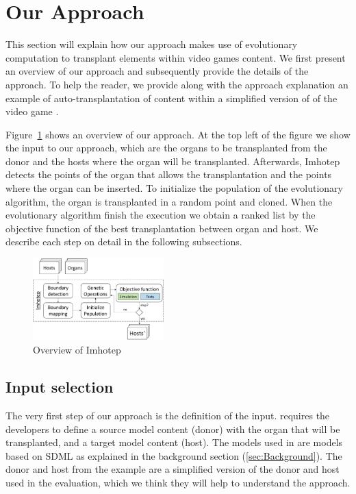 \section{Our \ApproachName{} Approach} 
\label{sec:Approach}

This section will explain how our approach makes use of evolutionary computation to transplant elements within video games content. We first present an overview of our approach and subsequently provide the details of
the approach. To help the reader, we provide along with the approach explanation an example of auto-transplantation of content within a simplified version of  of the video game \CaseStudy{}.

Figure~\ref{fig:approach} shows an overview of our approach.
At the top left of the figure we show the input to our approach, which are the organs to be transplanted from the donor and the hosts where the organ will be transplanted. Afterwards, Imhotep detects the points of the organ that allows the transplantation and the points where the organ can be inserted. To initialize the population of the evolutionary algorithm, the organ is transplanted in a random point and cloned. When the evolutionary algorithm finish the execution we obtain a ranked list by the objective function of the best transplantation between organ and host.
We describe each step on detail in the following subsections. 

\begin{figure}[h]
    \centering
    \includegraphics[width=0.45\textwidth]{Figures/overview.png}
    \caption{Overview of Imhotep}
    \label{fig:approach}
\end{figure}


\subsection{Input selection}

The very first step of our approach is the definition of the input. \ApproachName{} requires the developers to define a source model content (donor) with the organ that will be transplanted, and a target model content (host). The models used in \ApproachName{} are models based on SDML as explained in the background section (\ref{sec:Background}). The donor and host from the example are a simplified version of the donor and host used in the evaluation, which we think they will help to understand the approach.

